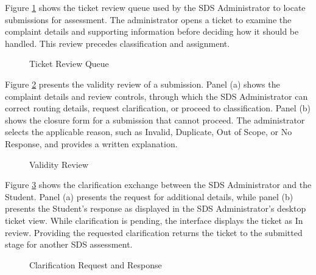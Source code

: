 Figure \ref{fig:review} shows the ticket review queue used by the SDS Administrator to locate submissions for assessment. The administrator opens a ticket to examine the complaint details and supporting information before deciding how it should be handled. This review precedes classification and assignment.

\renewcommand{\thefigure}{5.21}
\begin{figure}[htbp]
    \centering
    \caption{Ticket Review Queue}
    \label{fig:review}
\end{figure}
\FloatBarrier

Figure \ref{fig:valid} presents the validity review of a submission. Panel (a) shows the complaint details and review controls, through which the SDS Administrator can correct routing details, request clarification, or proceed to classification. Panel (b) shows the closure form for a submission that cannot proceed. The administrator selects the applicable reason, such as Invalid, Duplicate, Out of Scope, or No Response, and provides a written explanation.

\renewcommand{\thefigure}{5.22}
\begin{figure}[htbp]
    \centering
    \par{}\par
    \medskip
    \par{}\par
    \caption{Validity Review}
    \label{fig:valid}
\end{figure}
\FloatBarrier

Figure \ref{fig:clarify} shows the clarification exchange between the SDS Administrator and the Student. Panel (a) presents the request for additional details, while panel (b) presents the Student's response as displayed in the SDS Administrator's desktop ticket view. While clarification is pending, the interface displays the ticket as In review. Providing the requested clarification returns the ticket to the submitted stage for another SDS assessment.

\renewcommand{\thefigure}{5.23}
\begin{figure}[htbp]
    \centering
    \par{}\par
    \medskip
    \par{}\par
    \caption{Clarification Request and Response}
    \label{fig:clarify}
\end{figure}
\FloatBarrier

